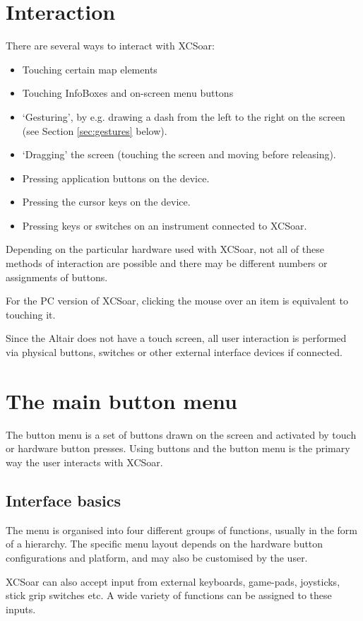 \section{Interaction}
There are several ways to interact with XCSoar:
\begin{itemize}
\item Touching certain map elements
\item Touching InfoBoxes and on-screen menu buttons
\item `Gesturing', by e.g. drawing a dash from the left to the right
  on the screen (see Section \ref{sec:gestures} below).
\item `Dragging' the screen (touching the screen and moving before releasing).
\item Pressing application buttons on the device.
\item Pressing the cursor keys on the device.
\item Pressing keys or switches on an instrument connected to XCSoar.
\end{itemize}
Depending on the particular hardware used with XCSoar, not all of these methods
of interaction are possible and there may be different numbers or assignments
of buttons.

For the PC version of XCSoar, clicking the mouse over an item is equivalent to
touching it.

Since the Altair does not have a touch screen, all user interaction is performed
via physical buttons, switches or other external interface devices if connected.

\section{The main button menu}
The button menu is a set of buttons drawn on the screen and activated by touch
or hardware button presses.  Using buttons and the button menu is the primary
way the user interacts with XCSoar.

\subsection*{Interface basics}
The menu is organised into four different groups of functions, usually in
the form of a hierarchy.  The specific menu layout depends on the
hardware button configurations and platform, and may also be customised by the
user.

XCSoar can also accept input from external keyboards, game-pads, joysticks,
stick grip switches etc. A wide variety of functions can be assigned to these
inputs.

